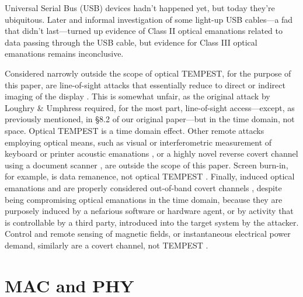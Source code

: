 \documentclass[conference]{IEEEtran}
\begin{document}
Universal Serial Bus (USB) devices hadn't happened yet, but today they're
ubiquitous. Later and informal investigation of some light-up USB cables---a
fad that didn't last---turned up evidence of Class II optical emanations
related to data passing through the USB cable, but evidence for Class III
optical emanations remains inconclusive.

Considered narrowly outside the scope of optical TEMPEST, for the purpose of
this paper, are line-of-sight attacks that essentially reduce to direct or
indirect imaging of the display
\cite{Backes2008,Balzarotti2008,Backes2009a,Raguram2011,Xu2013a,Jenkins2013a}.
This is somewhat unfair, as the original attack by Loughry \& Umphress
required, for the most part, line-of-sight access---except, as previously
mentioned, in \S 8.2 of our original paper---but in the time domain, not
space. Optical TEMPEST is
a time domain effect. Other remote attacks employing optical means, such as
visual or interferometric measurement of keyboard or printer acoustic
emanations \cite{Asonov2004,Zhuang2005,Berger2006,Backes2010}, or a highly
novel reverse covert channel using a document scanner \cite{Nassi2017a}, are
outside the scope of this paper. Screen burn-in, for example, is data
remanence, not optical TEMPEST \cite{MDH1998a}. Finally, induced optical
emanations
\cite{Sepetnitsky2014a,Guri2016b,Guri2017a,Guri2017b,Lopes2017a,Guri2017c,
Zhou2017,Zhou2018a} and \cite[Appendix A]{Loughry2002a} are properly
considered out-of-band covert channels
\cite{Lampson1973,Hanspach2014,Carrara2016}, despite being compromising
optical emanations in the time domain, because they are purposely induced by
a nefarious software or hardware agent, or by activity that is controllable
by a third party, introduced into the target system by the attacker. Control
and remote sensing of magnetic fields, or instantaneous electrical power
demand, similarly are a covert channel, not TEMPEST
\cite{Guri2018b,Guri2018e}.

\section{MAC and PHY}
\end{document}
